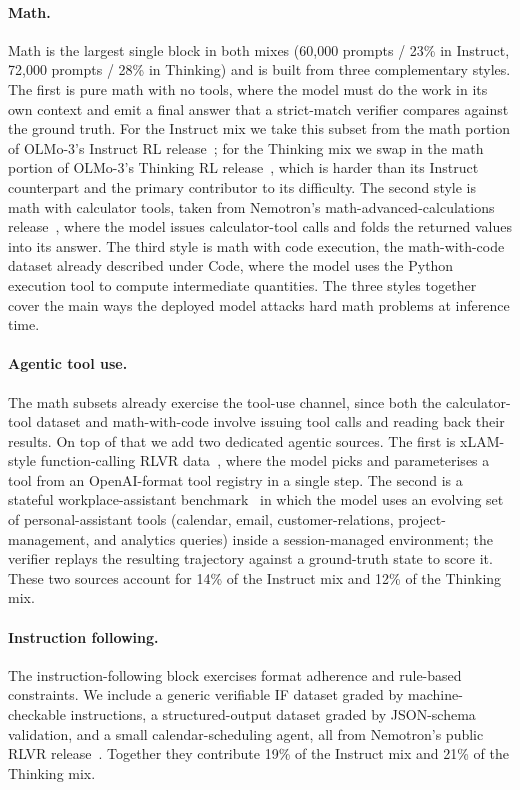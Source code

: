 \documentclass{llmxive}
\begin{document}
\paragraph{Math.}
Math is the largest single block in both mixes (60{,}000 prompts / 23\% in
Instruct, 72{,}000 prompts / 28\% in Thinking) and is built from three
complementary styles. The first is pure math with no tools, where the
model must do the work in its own context and emit a final answer that
a strict-match verifier compares against the ground truth. For the
Instruct mix we take this subset from the math portion of OLMo-3's
Instruct RL release~\cite{olmo3}; for the Thinking mix we swap in the
math portion of OLMo-3's Thinking RL release~\cite{olmo3}, which is
harder than its Instruct counterpart and the primary contributor to its difficulty. 
The second style is math with calculator
tools, taken from Nemotron's math-advanced-calculations
release~\cite{nemo-gym}, where the model issues calculator-tool calls
and folds the returned values into its answer. The third style is math with code execution, the
math-with-code dataset already described under Code, where the model
uses the Python execution tool to compute intermediate quantities. The
three styles together cover the main ways the deployed model attacks
hard math problems at inference time.

\paragraph{Agentic tool use.}
The math subsets already exercise the tool-use channel, since both the
calculator-tool dataset and math-with-code involve issuing tool calls
and reading back their results. On top of that we add two dedicated
agentic sources. The first is xLAM-style function-calling RLVR
data~\cite{nemo-gym}, where the model picks and parameterises a tool
from an OpenAI-format tool registry in a single step. The second is a
stateful workplace-assistant benchmark~\cite{nemo-gym} in which the
model uses an evolving set of personal-assistant tools (calendar,
email, customer-relations, project-management, and analytics queries)
inside a session-managed environment; the verifier replays the resulting trajectory against a
ground-truth state to score it. These two sources account for 14\% of
the Instruct mix and 12\% of the Thinking mix.

\paragraph{Instruction following.}
The instruction-following block exercises format adherence and
rule-based constraints. We include a generic verifiable IF dataset
graded by machine-checkable instructions, a structured-output dataset
graded by JSON-schema validation, and a small calendar-scheduling
agent, all from Nemotron's public RLVR
release~\cite{nemo-gym}. Together they contribute 19\% of the Instruct
mix and 21\% of the Thinking mix.
\end{document}
